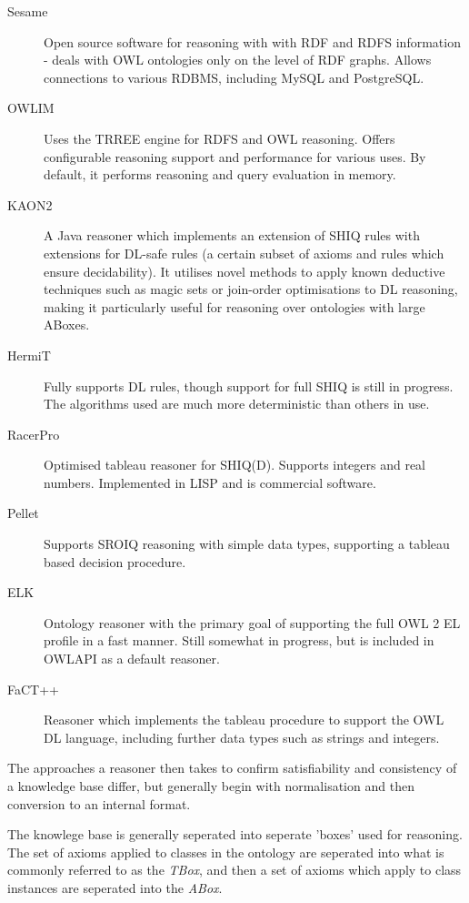 \documentclass{article}
\begin{document}
\begin{description}
    \item[Sesame] Open source software for reasoning with with RDF and RDFS
    information\cite{sesame} - deals with OWL ontologies only on the level of RDF graphs.
    Allows connections to various RDBMS, including MySQL and PostgreSQL.
    \item[OWLIM] Uses the TRREE engine for RDFS and OWL reasoning. Offers
    configurable reasoning support and performance for various uses. By default,
    it performs reasoning and query evaluation in memory.
    \item[KAON2] A Java reasoner which implements an extension of SHIQ rules with
    extensions for DL-safe rules (a certain subset of axioms and rules which
    ensure decidability).\cite{kaon} It utilises novel methods to apply known
    deductive techniques such as magic sets or join-order optimisations
    to DL reasoning, making it particularly useful for reasoning over ontologies
    with large ABoxes.\cite{kaonabox}
    \item[HermiT] Fully supports DL rules, though support for full SHIQ is still
    in progress. The algorithms used are much more deterministic than others in
    use.\cite{hermit}
    \item[RacerPro] Optimised tableau reasoner for SHIQ(D). Supports integers
    and real numbers. Implemented in LISP and is commercial
    software.\cite{racerpro}
    \item[Pellet] Supports SROIQ reasoning with simple data types, supporting a
    tableau based decision procedure.\cite{pellet}
    \item[ELK] Ontology reasoner with the primary goal of supporting the full
    OWL 2 EL profile in a fast manner. Still somewhat in progress, but is included
    in OWLAPI as a default reasoner.\cite{elk}
    \item[FaCT++] Reasoner which implements the tableau procedure to support the
    OWL DL language, including further data types such as strings and
    integers.\cite{fact}
\end{description}

The approaches a reasoner then takes to confirm satisfiability and consistency of
a knowledge base differ, but generally begin with normalisation and then
conversion to an internal format. 

The knowlege base is generally seperated into seperate 'boxes' used for
reasoning. The set of axioms applied to classes in the ontology are seperated
into what is commonly referred to as the \emph{TBox}, and then a set of axioms
which apply to class instances are seperated into the \emph{ABox}. 
\end{document}
